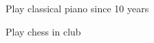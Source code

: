 

\begin{cventries}

  \cventry

    {
      \begin{cvitems} %
        \item {Play classical piano since 10 years}
        \item  {Play chess in club}
      \end{cvitems}
    }

\end{cventries}
